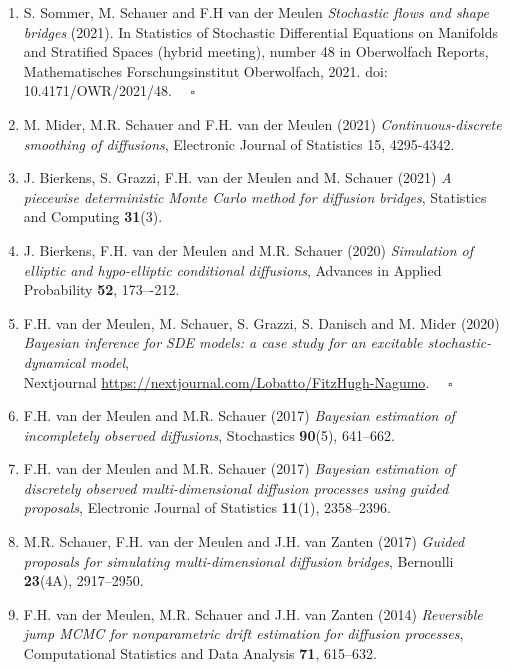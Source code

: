 \documentclass[
10pt, %
a4paper, %
oneside, %
headinclude,footinclude, %
BCOR5mm, %
]{scrartcl}
\begin{document}
\begin{enumerate}
\item {\sc S. Sommer, M. Schauer and F.H van der Meulen}  {\it Stochastic flows and shape bridges} (2021). In Statistics of Stochastic Differential Equations on Manifolds and Stratified Spaces (hybrid meeting), number 48 in Oberwolfach Reports, Mathematisches For\-schungs\-institut Oberwolfach, 2021. doi: 10.4171/OWR/2021/48. \hspace*{\fill} $\quad \square$


\item {\sc M. Mider, M.R. Schauer and F.H. van der Meulen (2021)} {\it  Continuous-discrete smoothing of diffusions}, Electronic Journal of Statistics 15, 4295-4342.   


\item {\sc J. Bierkens, S. Grazzi, F.H. van der Meulen and M. Schauer (2021)} {\it A piecewise deterministic Monte Carlo method for diffusion bridges}, Statistics and Computing {\bf 31}(3).

\item {\sc J. Bierkens, F.H. van der Meulen and M.R. Schauer (2020)} {\it  Simulation of elliptic and hypo-elliptic conditional diffusions}, Advances in Applied Probability {\bf 52}, 173–-212.

\item {\sc F.H. van der Meulen, M. Schauer, S. Grazzi, S. Danisch and M. Mider (2020)} {\it  Bayesian inference for SDE models: a case study for an excitable stochastic-dynamical model},  \\ Nextjournal \url{https://nextjournal.com/Lobatto/FitzHugh-Nagumo}.\hspace*{\fill} $\quad \square$

\item {\sc F.H. van der Meulen and M.R. Schauer (2017)} {\it  Bayesian estimation of incompletely observed diffusions}, Stochastics {\bf 90}(5), 641--662.

\item {\sc F.H. van der Meulen and M.R. Schauer (2017)} {\it  Bayesian estimation of discretely observed multi-dimensional diffusion processes using guided proposals},  Electronic Journal of Statistics {\bf 11}(1), 2358--2396.

\item {\sc M.R. Schauer, F.H.  van der Meulen and J.H. van Zanten (2017)} {\it  Guided proposals for simulating multi-dimensional diffusion bridges}, Bernoulli {\bf 23}(4A), 2917--2950.

\item {\sc F.H. van der Meulen, M.R. Schauer and J.H. van Zanten (2014)} {\it  Reversible jump MCMC for nonparametric drift estimation for diffusion processes}, Computational Statistics and Data Analysis {\bf 71}, 615--632.


\end{enumerate}
\end{document}
